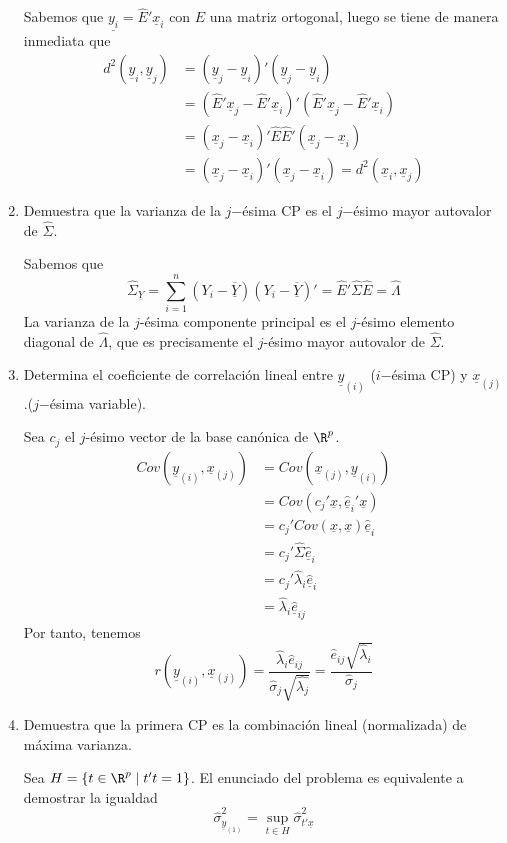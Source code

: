\documentclass[twoside]{article}
\newcommand{\muestra}[1]{{\underline{#1}}}
\newcommand{\m}[1]{{\muestra{#1}}}
\newcommand{\ev}{\m{\hat{e}}}
\begin{document}
\begin{enumerate}
Sabemos que $\muestra{y_i} = \hat{E}'\m{x}_i$ con $E$ una matriz ortogonal, luego se tiene de manera inmediata que 
\begin{align*}
d^2(\m{y}_i,\m{y}_j)&=(\m{y}_j-\m{y}_i)'(\m{y}_j-\m{y}_i)\\
& = (\hat{E}'\m{x}_j-\hat{E}'\m{x}_i)'(\hat{E}'\m{x}_j-\hat{E}'\m{x}_i)\\
& = (\m{x}_j-\m{x}_i)'\hat{E}\hat{E}'(\m{x}_j-\m{x}_i)\\
& = (\m{x}_j-\m{x}_i) '(\m{x}_j-\m{x}_i) = d^2(\m{x}_i,\m{x}_j)
\end{align*}

\item Demuestra que la varianza de la $j$−ésima CP es el $j$−ésimo mayor autovalor de $\widehat{\Sigma}$.

Sabemos que $$\hat{\Sigma}_{\muestra{Y}} =\sum_{i=1}^n (Y_i-\m{\overline{Y}})(Y_i-\m{\overline{Y}})' =\hat{E}' \hat{\Sigma}\hat{E}= \hat{\Lambda}$$
La varianza de la $j$-ésima componente principal es el $j$-ésimo elemento diagonal de $\hat{\Lambda}$, que es precisamente el $j$-ésimo mayor autovalor de $\hat{\Sigma}$.

\item Determina el coeficiente de correlación lineal entre $\muestra{y}_{{(i)}}$ ($i$−ésima CP) y $\muestra{x}_{(j)}$ .($j$−ésima variable).

Sea $c_j$ el $j$-ésimo vector de la base canónica de $\R^p$.
\begin{align*}
Cov(\muestra{y}_{{(i)}},\muestra{x}_{{(j)}}) &= Cov(\muestra{x}_{{(j)}},\muestra{y}_{{(i)}})\\
& = Cov(c_j'\muestra{x},\ev_i' \muestra{x})\\
&= c_j'Cov(\muestra{x},\muestra{x})\ev_i \\
&= c_j'\hat{\Sigma}\ev_i \\
&= c_j' \hat{\lambda}_i\ev_i \\
&= \hat{\lambda}_i \ev_{ij}
\end{align*} 
Por tanto, tenemos
$$
r(\muestra{y}_{{(i)}},\muestra{x}_{{(j)}}) = \frac{\hat{\lambda}_i \hat{e}_{ij}}{\hat{\sigma}_{j}\sqrt{\hat{\lambda_j}}} = \frac{\hat{e}_{ij}\sqrt{\hat{\lambda}_i}}{\hat{\sigma}_j}
$$
\newpage
\item Demuestra que la primera CP es la combinación lineal (normalizada) de máxima varianza. 

Sea $H=\{t\in \R^p \mid t't=1\}$. El enunciado del problema es equivalente a demostrar la igualdad
$$
\hat{\sigma}_{\muestra{y}_{(1)}}^2=\sup_{t\in H}\hat{\sigma}^2_{t'\muestra{x}}
$$


\end{enumerate}
\end{document}

